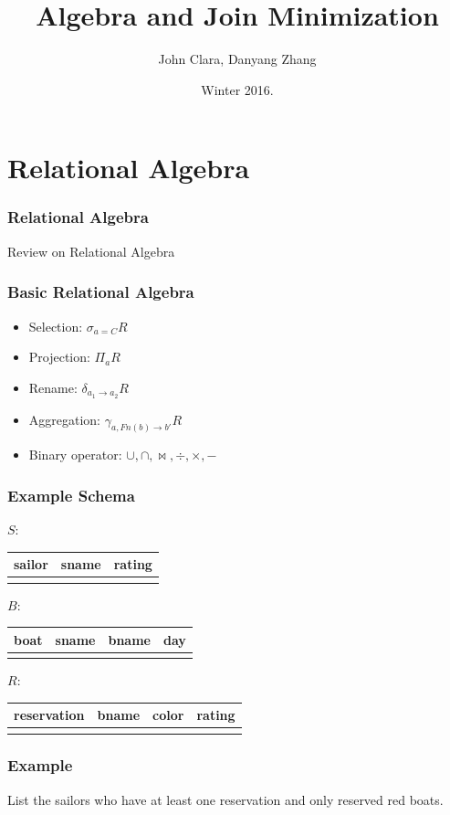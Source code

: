 \documentclass{beamer}
\begin{document}
\title{Algebra and Join Minimization}
\author{John Clara, Danyang Zhang}
\date[WI 2016]{Winter 2016.}

\subject{Algebra and Join Minimization}

\begin{frame}
  \titlepage
\end{frame}
\section{Relational Algebra}
\begin{frame}
  \frametitle{Relational Algebra}
  \begin{itemize}
  Review on Relational Algebra
  \end{itemize}
\end{frame}
\begin{frame}
  \frametitle{Basic Relational Algebra}
  \begin{itemize}
  \item Selection: $\sigma_{a=C} R$
  \item Projection: $\Pi_{a}R$
  \item Rename: $\delta_{a_1 \rightarrow a_2}R$
  \item Aggregation: $\gamma_{a, Fn(b)\rightarrow b'}R$
  \item Binary operator: $\cup, \cap, \bowtie, \div, \times, -$
  \end{itemize}
\end{frame}
\begin{frame}
\frametitle{Example Schema}
$S: $
\begin{tabular}{c|cc}
  sailor & sname & rating \\
  \hline
  \\
\end{tabular}

$B: $
\begin{tabular}{c|ccc}
  boat & sname & bname & day\\
  \hline
  \\
\end{tabular}

$R:$
\begin{tabular}{c|ccc}
  reservation & bname  & color & rating \\
  \hline
  \\
\end{tabular}
\end{frame}
\begin{frame}
\frametitle{Example}
List the sailors who have at least one reservation and only reserved red boats.  
\end{frame}
\end{document}
